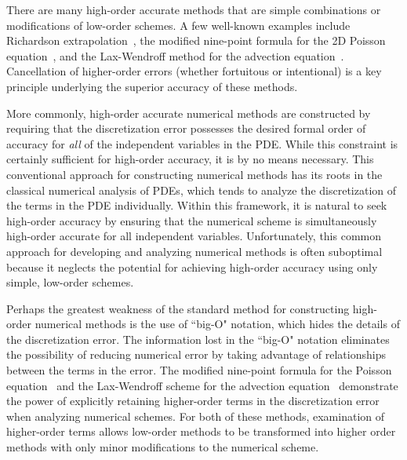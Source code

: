 \documentclass[oneeqnum,onefignum,onetabnum,onethmnum]{siamltex}
\begin{document}
There are many high-order accurate methods that are simple combinations or 
modifications of low-order schemes.  A few well-known examples include 
Richardson extrapolation~\cite{richardson_1927, heath_book}, the modified 
nine-point formula for the 2D Poisson equation~\cite{iserles_book}, and the 
Lax-Wendroff method for the advection equation~\cite{leveque_book_1992, 
leveque_book_2002, gko_book}.  Cancellation of higher-order errors (whether 
fortuitous or intentional) is a key principle underlying the superior 
accuracy of these methods.

More commonly, high-order accurate numerical methods are constructed by 
requiring that the discretization error possesses the desired formal order of 
accuracy for \emph{all} of the independent variables in the PDE.  While this 
constraint is certainly sufficient for high-order accuracy, it is by no means 
necessary.  This conventional approach for constructing numerical methods 
has its roots in the classical numerical analysis of PDEs, which tends to 
analyze the discretization of the terms in the PDE individually.  Within this 
framework, it is natural to seek high-order accuracy by ensuring that the 
numerical scheme is simultaneously high-order accurate for all independent 
variables.  Unfortunately, this common approach for developing and analyzing 
numerical methods is often suboptimal because it neglects the potential for 
achieving high-order accuracy using only simple, low-order schemes.

Perhaps the greatest weakness of the standard method for constructing 
high-order numerical methods is the use of ``big-O" notation, which hides 
the details of the discretization error.  The information lost in the 
``big-O" notation eliminates the possibility of reducing numerical error by 
taking advantage of relationships between the terms in the error.  The 
modified nine-point formula for the Poisson equation~\cite{iserles_book} 
and the Lax-Wendroff scheme for the advection equation~\cite{leveque_book_1992,
leveque_book_2002, gko_book} demonstrate the power of explicitly retaining 
higher-order terms in the discretization error when analyzing numerical 
schemes.  For both of these methods, examination of higher-order terms allows 
low-order methods to be transformed into higher order methods with only minor 
modifications to the numerical scheme.  
\end{document}
